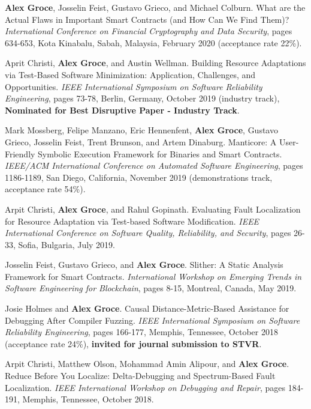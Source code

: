\documentclass[ComputerScience]{vita}
\begin{document}
\begin{vita}
\begin{Refereed Conference and Workshop Publications}
\item {\bf Alex Groce}, Josselin Feist, Gustavo Grieco, and Michael Colburn. 
\newblock What are the Actual
Flaws in Important Smart Contracts (and How Can We Find Them)?
\newblock \emph{International Conference on Financial Cryptography and
  Data Security}, pages 634-653, Kota Kinabalu, Sabah, Malaysia, February 2020
(acceptance rate 22\%).

\item Aprit Christi, {\bf Alex Groce}, and Austin Wellman.
\newblock Building Resource Adaptations via Test-Based Software
Minimization: Application, Challenges, and Opportunities.
\newblock \emph{IEEE International Symposium on Software Reliability 
  Engineering}, pages 73-78, Berlin, Germany, October
2019 (industry track), {\bf Nominated for Best Disruptive Paper - Industry Track}.
  
\item Mark Mossberg, Felipe Manzano, Eric Hennenfent, {\bf Alex
    Groce}, Gustavo Grieco, Josselin Feist, Trent Brunson, and Artem Dinaburg.
\newblock Manticore: A User-Friendly Symbolic Execution Framework for Binaries and Smart Contracts.
\newblock \emph{IEEE/ACM International Conference on Automated Software
  Engineering}, pages 1186-1189, San Diego, California,
November 2019 (demonstrations track, acceptance rate 54\%).
  
\item Arpit Christi, {\bf Alex Groce}, and Rahul Gopinath.
\newblock Evaluating Fault Localization for Resource Adaptation via Test-based Software Modification.
\newblock \emph{IEEE International Conference on Software Quality,
  Reliability, and Security}, pages 26-33,
Sofia, Bulgaria, July 2019.

\item Josselin Feist, Gustavo Grieco, and {\bf Alex Groce}. 
\newblock Slither: A Static Analysis Framework for Smart Contracts. 
\newblock \emph{International Workshop on Emerging Trends in Software
  Engineering for Blockchain}, pages 8-15, Montreal,
Canada, May 2019.
  
\item Josie Holmes and {\bf Alex Groce}. 
\newblock Causal Distance-Metric-Based Assistance for Debugging After 
Compiler Fuzzing. 
\newblock \emph{IEEE International Symposium on Software Reliability 
  Engineering}, pages 166-177, Memphis, Tennessee, October 
2018 (acceptance rate 24\%), {\bf invited for journal submission to STVR}.

\item Arpit Christi, Matthew Olson, Mohammad Amin Alipour, and {\bf Alex Groce}. 
\newblock Reduce Before You Localize: Delta-Debugging and Spectrum-Based Fault Localization. 
\newblock \emph{IEEE International Workshop on Debugging and Repair},
pages 184-191, Memphis, Tennessee, October  2018.


\end{Refereed Conference and Workshop Publications}
\end{vita}
\end{document}
